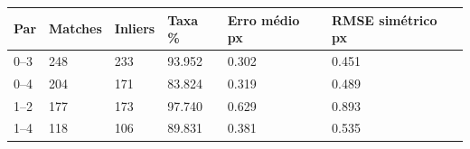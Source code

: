\begin{tabular}{llllll}
\hline
Par & Matches & Inliers & Taxa \% & Erro médio px & RMSE simétrico px \\ \hline
0--3 & 248 & 233 & 93.952 & 0.302 & 0.451 \\
0--4 & 204 & 171 & 83.824 & 0.319 & 0.489 \\
1--2 & 177 & 173 & 97.740 & 0.629 & 0.893 \\
1--4 & 118 & 106 & 89.831 & 0.381 & 0.535 \\
\hline
\end{tabular}

